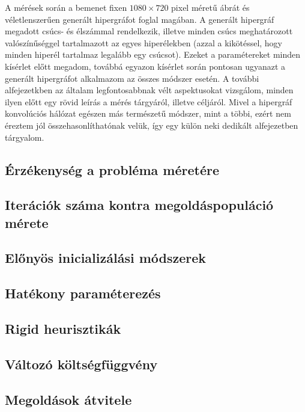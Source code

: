 A mérések során a bemenet fixen $1080 \times 720$ pixel méretű ábrát és véletlenszerűen generált hipergráfot foglal magában. A generált hipergráf megadott csúcs- és élszámmal rendelkezik, illetve minden csúcs meghatározott valószínűséggel tartalmazott az egyes hiperélekben (azzal a kikötéssel, hogy minden hiperél tartalmaz legalább egy csúcsot). Ezeket a paramétereket minden kísérlet előtt megadom, továbbá egyazon kísérlet során pontosan ugyanazt a generált hipergráfot alkalmazom az összes módszer esetén. A további alfejezetkben az általam legfontosabbnak vélt aspektusokat vizsgálom, minden ilyen előtt egy rövid leírás a mérés tárgyáról, illetve céljáról. Mivel a hipergráf konvolúciós hálózat egészen más természetű módszer, mint a többi, ezért nem éreztem jól összehasonlíthatónak velük, így egy külön neki dedikált alfejezetben tárgyalom.



\subsection{Érzékenység a probléma méretére}


\subsection{Iterációk száma kontra megoldáspopuláció mérete}


\subsection{Előnyös inicializálási módszerek}


\subsection{Hatékony paraméterezés}


\subsection{Rigid heurisztikák}


\subsection{Változó költségfüggvény}


\subsection{Megoldások átvitele}


